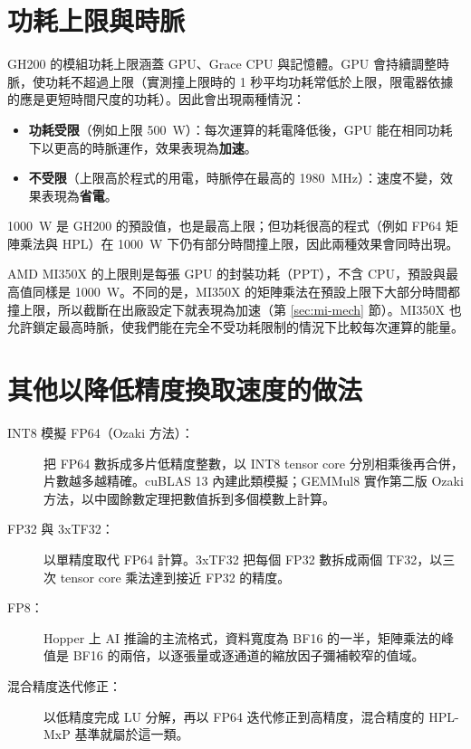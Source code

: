 \section{功耗上限與時脈}\label{sec:capclock}

GH200 的模組功耗上限涵蓋 GPU、Grace CPU 與記憶體。GPU 會持續調整時脈，使功耗不超過上限（實測撞上限時的 1 秒平均功耗常低於上限，限電器依據的應是更短時間尺度的功耗）。因此會出現兩種情況：

\begin{itemize}
  \item \textbf{功耗受限}（例如上限 500~W）：每次運算的耗電降低後，GPU 能在相同功耗下以更高的時脈運作，效果表現為\textbf{加速}。
  \item \textbf{不受限}（上限高於程式的用電，時脈停在最高的 1980~MHz）：速度不變，效果表現為\textbf{省電}。
\end{itemize}

1000~W 是 GH200 的預設值，也是最高上限；但功耗很高的程式（例如 FP64 矩陣乘法與 HPL）在 1000~W 下仍有部分時間撞上限，因此兩種效果會同時出現。

AMD MI350X 的上限則是每張 GPU 的封裝功耗（PPT），不含 CPU，預設與最高值同樣是 1000~W。不同的是，MI350X 的矩陣乘法在預設上限下大部分時間都撞上限，所以截斷在出廠設定下就表現為加速（第 \ref{sec:mi-mech} 節）。MI350X 也允許鎖定最高時脈，使我們能在完全不受功耗限制的情況下比較每次運算的能量。

\section{其他以降低精度換取速度的做法}\label{sec:alternatives}

\begin{description}
  \item[INT8 模擬 FP64（Ozaki 方法）：] 把 FP64 數拆成多片低精度整數，以 INT8 tensor core 分別相乘後再合併，片數越多越精確。cuBLAS 13 內建此類模擬；GEMMul8 實作第二版 Ozaki 方法，以中國餘數定理把數值拆到多個模數上計算。
  \item[FP32 與 3xTF32：] 以單精度取代 FP64 計算。3xTF32 把每個 FP32 數拆成兩個 TF32，以三次 tensor core 乘法達到接近 FP32 的精度。
  \item[FP8：] Hopper 上 AI 推論的主流格式，資料寬度為 BF16 的一半，矩陣乘法的峰值是 BF16 的兩倍，以逐張量或逐通道的縮放因子彌補較窄的值域。
  \item[混合精度迭代修正：] 以低精度完成 LU 分解，再以 FP64 迭代修正到高精度，混合精度的 HPL-MxP 基準就屬於這一類。
\end{description}

